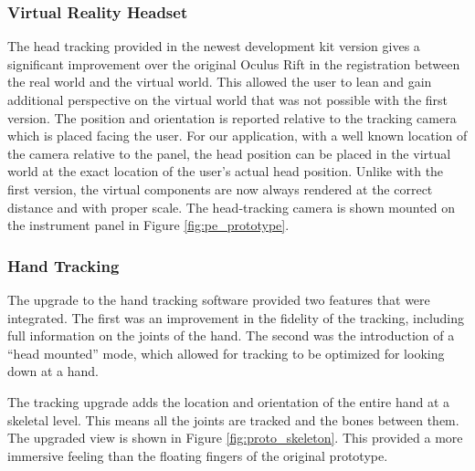 \subsubsection{Virtual Reality Headset}

The head tracking provided in the newest development kit version gives a significant improvement over the original Oculus Rift in the registration between the real world and the virtual world.
This allowed the user to lean and gain additional perspective on the virtual world that was not possible with the first version.
The position and orientation is reported relative to the tracking camera which is placed facing the user.
For our application, with a well known location of the camera relative to the panel, the head position can be placed in the virtual world at the exact location of the user's actual head position.
Unlike with the first version, the virtual components are now always rendered at the correct distance and with proper scale.
The head-tracking camera is shown mounted on the instrument panel in Figure \ref{fig:pe_prototype}.

\subsubsection{Hand Tracking}

The upgrade to the hand tracking software provided two features that were integrated.
The first was an improvement in the fidelity of the tracking, including full information on the joints of the hand.
The second was the introduction of a ``head mounted'' mode, which allowed for tracking to be optimized for looking down at a hand.

The tracking upgrade adds the location and orientation of the entire hand at a skeletal level.
This means all the joints are tracked and the bones between them.
The upgraded view is shown in Figure \ref{fig:proto_skeleton}.
This provided a more immersive feeling than the floating fingers of the original prototype.

